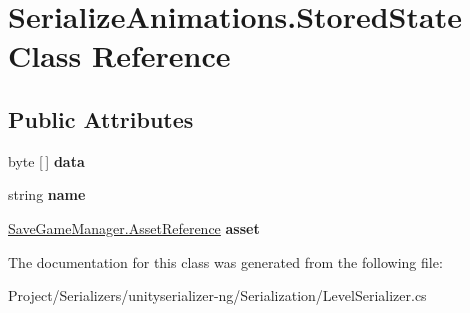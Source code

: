 \hypertarget{class_serialize_animations_1_1_stored_state}{}\section{Serialize\+Animations.\+Stored\+State Class Reference}
\label{class_serialize_animations_1_1_stored_state}
\subsection*{Public Attributes}
\begin{DoxyCompactItemize}
\item 
\mbox{\label{class_serialize_animations_1_1_stored_state_a7689e54eaf7039191650d5008df1b8e2}} 
byte \mbox{[}$\,$\mbox{]} {\bfseries data}
\item 
\mbox{\label{class_serialize_animations_1_1_stored_state_a2672a0862ad5485351ea58c5e61cbe58}} 
string {\bfseries name}
\item 
\mbox{\label{class_serialize_animations_1_1_stored_state_ad23989e0d99d1521ae4e3c67b30b496e}} 
\hyperlink{class_save_game_manager_1_1_asset_reference}{Save\+Game\+Manager.\+Asset\+Reference} {\bfseries asset}
\end{DoxyCompactItemize}


The documentation for this class was generated from the following file\+:\begin{DoxyCompactItemize}
\item 
Project/\+Serializers/unityserializer-\/ng/\+Serialization/Level\+Serializer.\+cs\end{DoxyCompactItemize}
